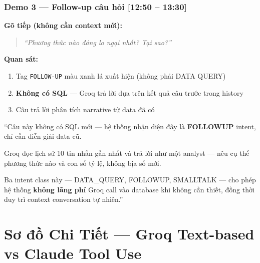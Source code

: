 \documentclass[12pt, a4paper]{article}
\newenvironment{speakerbox}[2]{%
  \begin{tcolorbox}[
    enhanced, breakable,
    colback=#1!6!white, colframe=#1,
    colbacktitle=#1, coltitle=white,
    fonttitle=\bfseries\large,
    title={#2}, arc=4pt, boxrule=1.5pt,
    left=8pt, right=8pt, top=6pt, bottom=6pt,
  ]
}{\end{tcolorbox}}
\newcommand{\timing}[1]{%
  \hfill{\small\bfseries\color{gray}[#1]}%
}
\begin{document}
\begin{speakerbox}{p4color}{\faUser\ Người 4 · Phần Agentic BI (khoảng 2 phút)}
\subsubsection*{Demo 3 — Follow-up câu hỏi \timing{12:50 -- 13:30}}

\begin{demobox}
\textbf{Gõ tiếp (không cần context mới):}
\begin{quote}
\textit{``Phương thức nào đáng lo ngại nhất? Tại sao?''}
\end{quote}
\textbf{Quan sát:}
\begin{enumerate}[leftmargin=1.5em, itemsep=2pt]
  \item Tag \texttt{FOLLOW-UP} màu xanh lá xuất hiện (không phải DATA QUERY)
  \item \textbf{Không có SQL} --- Groq trả lời dựa trên kết quả câu trước trong history
  \item Câu trả lời phân tích narrative từ data đã có
\end{enumerate}
\end{demobox}

\begin{scriptbox}
``Câu này không có SQL mới --- hệ thống nhận diện đây là \textbf{FOLLOWUP} intent,
chỉ cần diễn giải data cũ.

Groq đọc lịch sử 10 tin nhắn gần nhất và trả lời như một analyst --- nêu cụ thể
phương thức nào và con số tỷ lệ, không bịa số mới.

Ba intent class này --- DATA\_QUERY, FOLLOWUP, SMALLTALK --- cho phép hệ thống
\textbf{không lãng phí} Groq call vào database khi không cần thiết,
đồng thời duy trì context conversation tự nhiên.''
\end{scriptbox}

\end{speakerbox}

\newpage

\section{Sơ đồ Chi Tiết — Groq Text-based vs Claude Tool Use}
\end{document}
